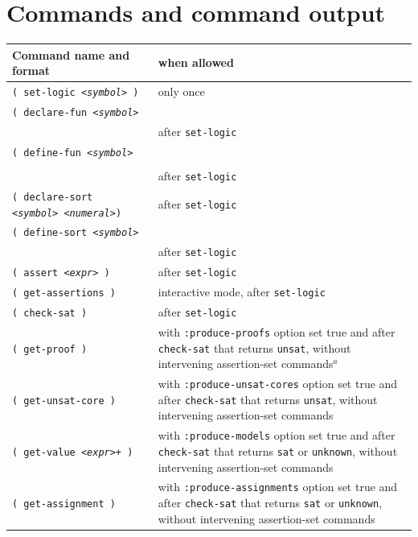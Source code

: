 \documentclass[12pt,oneside]{report}
\newcommand{\expr}{{\it <expr>}}
\newcommand{\sym}{{\it <symbol>}}
\newcommand{\numeral}{{\it <numeral>}}
\newcommand{\Sort}{{\it <sort-expr>}}
\begin{document}
\section{Commands and command output}
\label{Commands}

\begin{table}
\begin{center}
\begin{tabular}{|p{3.07in}|p{2.5in}|}
\hline
Command name and format & when allowed \\
\hline
{\tt ( set-logic \sym~)} & only once \\
{\tt ( declare-fun \sym~ }&  \\ \hspace*{.5in}{\tt (\Sort*) \Sort)} & after {\tt set-logic} \\
{\tt ( define-fun \sym~ }&  \\ \hspace*{.5in}{\tt ((\sym~\Sort)*)} &  \\ \hspace*{.5in}{\tt \Sort~\expr)} &  after {\tt set-logic} \\
{\tt ( declare-sort \sym~\numeral)} &  after {\tt set-logic} \\
{\tt ( define-sort \sym}&  \\ \hspace*{.5in}{\tt (\sym+) \expr~)} &  after {\tt set-logic} \\
{\tt ( assert \expr\ )} &  after {\tt set-logic} \\
{\tt ( get-assertions )} &  interactive mode, after {\tt set-logic} \\
{\tt ( check-sat )} &  after {\tt set-logic} \\
{\tt ( get-proof )} & with {\tt :produce-proofs} option set true and after {\tt check-sat} that returns {\tt unsat}, without intervening assertion-set commands$^a$ \\
{\tt ( get-unsat-core )} &  with {\tt :produce-unsat-cores} option set true and after {\tt check-sat} that returns {\tt unsat}, without intervening assertion-set commands \\
{\tt ( get-value \expr+ )} &  with {\tt :produce-models} option set true and after {\tt check-sat} that returns {\tt sat} or {\tt unknown}, without intervening assertion-set commands \\
{\tt ( get-assignment )} &  with {\tt :produce-assignments} option set true and after {\tt check-sat} that returns {\tt sat} or {\tt unknown}, without intervening assertion-set commands \\



\end{tabular}
\end{center}
\end{table}
\end{document}

